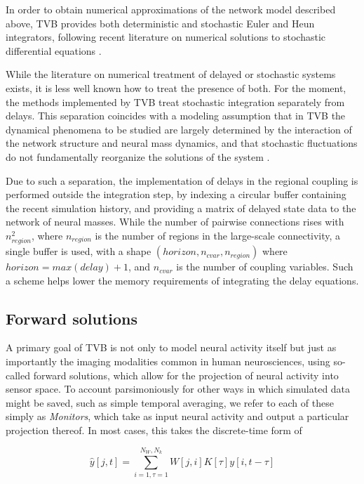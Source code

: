 \documentclass{bioinfo}
\begin{document}
	In order to obtain numerical approximations of the network model 
	described above, TVB provides both deterministic and stochastic
	Euler and Heun integrators,
	following recent literature on numerical solutions to stochastic
	differential equations \citep{Kloeden_1995,Mannella_2002,Mannella_1989}.

	While the literature on numerical treatment of delayed or 
	stochastic systems exists, it is less well known how to treat 
	the presence of both. For the moment, the methods implemented by TVB
	treat stochastic integration separately from delays. 
	This separation coincides with a modeling assumption that in
	TVB the dynamical phenomena to be studied are largely determined
	by the interaction of the network structure and neural mass dynamics, 
	and that stochastic fluctuations do not fundamentally reorganize the
	solutions of the system \citep{Ghosh_2008,Deco_2009,Deco_2011,Deco_Senden_2012}.

	Due to such a separation, the implementation of delays in the
	regional coupling is performed outside the integration step,
	by indexing a circular buffer containing the recent simulation 
	history, and providing a matrix of delayed state data to the 
	network of neural masses. While the number of pairwise
	connections rises with $n_{region}^2$, where $n_{region}$ is
	the number of regions in the large-scale connectivity, 
	a single buffer is used, with a shape
	$(horizon, n_{cvar}, n_{region})$ where $horizon = max(delay) + 1$,
	and
	$n_{cvar}$ is the number of coupling variables. Such a scheme helps 
	lower the memory requirements of integrating the delay equations.

\subsection{Forward solutions}

	A primary goal of TVB is not only to model neural activity itself
	but just as importantly the imaging modalities common in human 
	neurosciences, using so-called forward solutions, which allow for
	the projection of neural activity into sensor space. To account
	parsimoniously for other ways in which simulated data might be saved, 
	such as simple temporal averaging, we refer to each of these simply as 
	\textit{Monitors}, which take as input neural activity and 
	output a particular projection thereof. In most cases, this 
	takes the discrete-time form of

	\[ \hat{y}[j, t] = \sum_{i=1, \tau=1}^{N_W, N_k} W[j, i] K[\tau] y[i, t-\tau] \]
\end{document}
